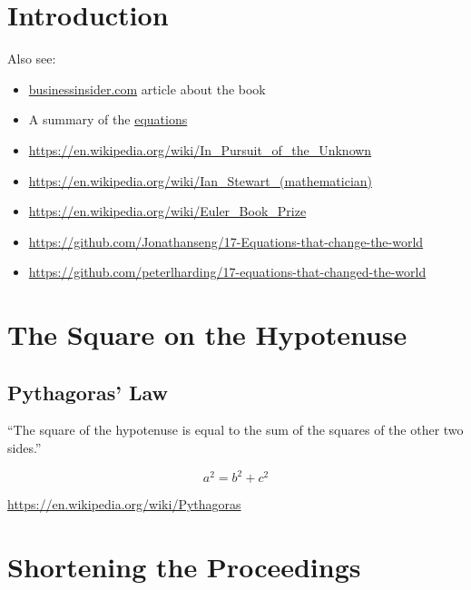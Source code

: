 \documentclass[12pt]{article}
\begin{document}
\section*{Introduction}


Also see:

\begin{itemize}
	\item \href{https://www.businessinsider.com/17-equations-that-changed-the-world-2014-3}{businessinsider.com} article about the book
   	\item A summary of the \href{https://i.insider.com/53289f55eab8ea3d524b5f3a}{equations}
	\item \url{https://en.wikipedia.org/wiki/In_Pursuit_of_the_Unknown}
	\item \url{https://en.wikipedia.org/wiki/Ian_Stewart_(mathematician)}
	\item \url{https://en.wikipedia.org/wiki/Euler_Book_Prize}
	\item \url{https://github.com/Jonathanseng/17-Equations-that-change-the-world}
	\item \url{https://github.com/peterlharding/17-equations-that-changed-the-world}
\end{itemize}

\newpage
	
\section{The Square on the Hypotenuse}
\subsection{Pythagoras' Law}

``The square of the hypotenuse is equal to the sum of the squares of the other two sides.''

\vspace{2em}

\begin{equation*} a^2 = b^2 + c^2  \end{equation*}

\vspace{2em}

\url{https://en.wikipedia.org/wiki/Pythagoras}
	
\newpage


\section{Shortening the Proceedings}
	
\end{document}
